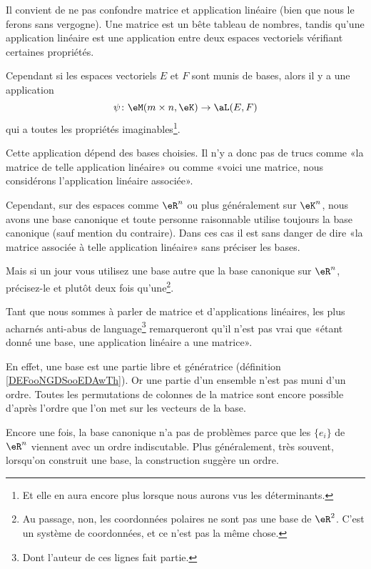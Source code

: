 \begin{normaltext}
	Il convient de ne pas confondre matrice et application linéaire (bien que nous le ferons sans vergogne). Une matrice est un bête tableau de nombres, tandis qu'une application linéaire est une application entre deux espaces vectoriels vérifiant certaines propriétés.

	Cependant si les espaces vectoriels \( E\) et \( F\) sont munis de bases, alors il y a une application
	\begin{equation}
		\psi\colon \eM(m\times n,\eK)\to \aL(E,F)
	\end{equation}
	qui a toutes les propriétés imaginables\footnote{Et elle en aura encore plus lorsque nous aurons vus les déterminants.}.

	Cette application dépend des bases choisies. Il n'y a donc pas de trucs comme «la matrice de telle application linéaire» ou comme «voici une matrice, nous considérons l'application linéaire associée».

	Cependant, sur des espaces comme \( \eR^n\) ou plus généralement sur \( \eK^n\), nous avons une base canonique et toute personne raisonnable utilise toujours la base canonique (sauf mention du contraire). Dans ces cas il est sans danger de dire «la matrice associée à telle application linéaire» sans préciser les bases.

	Mais si un jour vous utilisez une base autre que la base canonique sur \( \eR^n\), précisez-le et plutôt deux fois qu'une\footnote{Au passage, non, les coordonnées polaires ne sont pas une base de \( \eR^2\). C'est un système de coordonnées, et ce n'est pas la même chose.}.
\end{normaltext}

\begin{normaltext}
	Tant que nous sommes à parler de matrice et d'applications linéaires, les plus acharnés anti-abus de language\footnote{Dont l'auteur de ces lignes fait partie.} remarqueront qu'il n'est pas vrai que «étant donné une base, une application linéaire a une matrice».

	En effet, une base est une partie libre et génératrice (définition \ref{DEFooNGDSooEDAwTh}). Or une partie d'un ensemble n'est pas muni d'un ordre. Toutes les permutations de colonnes de la matrice sont encore possible d'après l'ordre que l'on met sur les vecteurs de la base.

	Encore une fois, la base canonique n'a pas de problèmes parce que les \( \{ e_i \}\) de \( \eR^n\) viennent avec un ordre indiscutable. Plus généralement, très souvent, lorsqu'on construit une base, la construction suggère un ordre.
\end{normaltext}

